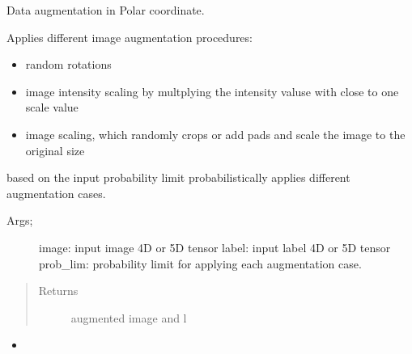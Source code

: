 \documentclass[letterpaper,10pt,english]{sphinxmanual}
\begin{document}
\begin{fulllineitems}
\label{\detokenize{index:util.load_batch.img_aug_polar}}
Data augmentation in Polar coordinate.

Applies different image augmentation procedures:
\begin{itemize}
\item {} 
random rotations

\item {} 
image intensity scaling by multplying the intensity valuse with close to one scale value

\item {} 
image scaling, which randomly crops or add pads and scale the image to the original size

\end{itemize}

based on the input probability limit probabilistically applies different augmentation cases.
\begin{description}
\item[{Args;}] \leavevmode
image: input image 4D or 5D tensor
label: input label 4D or 5D tensor
prob\_lim: probability limit for applying each augmentation case.

\end{description}
\begin{quote}\begin{description}
\item[{Returns}] \leavevmode
augmented image and l

\end{description}\end{quote}



\begin{itemize}
\item {} 
{\hyperref[\detokenize{index:util.load_batch.img_aug}]{}}

\end{itemize}



\end{fulllineitems}

\end{document}
